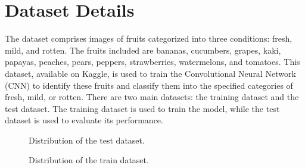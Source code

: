 \documentclass[a4paper,oneside,11pt]{book}
\begin{document}
\section{Dataset Details}
The dataset comprises images of fruits categorized into three conditions: fresh, mild, and rotten. The fruits included are bananas, cucumbers, grapes, kaki, papayas, peaches, pears, peppers, strawberries, watermelons, and tomatoes. This dataset, available on Kaggle, is used to train the Convolutional Neural Network (CNN) to identify these fruits and classify them into the specified categories of fresh, mild, or rotten. There are two main datasets: the training dataset and the test dataset. The training dataset is used to train the model, while the test dataset is used to evaluate its performance.
\begin{figure}[H]
    \centering
    \caption{Distribution of the test dataset.}
\end{figure}
\begin{figure}[H]
    \centering
    \caption{Distribution of the train dataset.}
\end{figure}
\end{document}
